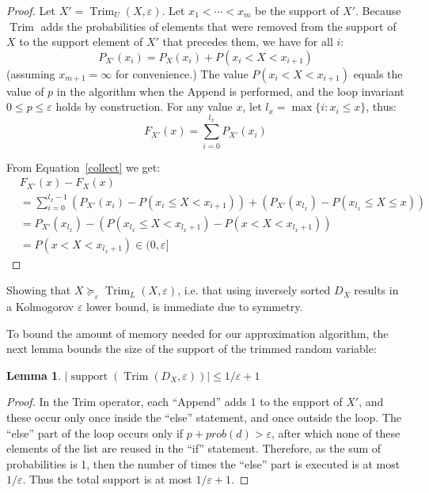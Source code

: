 \documentclass[review]{elsarticle}
\newtheorem{lemma}{Lemma}
\DeclareMathOperator{\Trim}{Trim}
\begin{document}
\begin{proof}
Let $X'=\Trim_U(X,\varepsilon)$. 
Let $x_1{<}\cdots{<}x_m$ be the support of $X'$. 
Because $\Trim$ adds the probabilities of elements that were removed from the support of $X$ 
to the support element of $X'$ that precedes them, 
we have for all $i$:
\begin{equation}
P_{X'}(x_i) = P_X(x_i) +  P(x_i < X < x_{i+1})
\label{collect}
\end{equation}
(assuming $x_{m+1} = \infty$ for convenience.)
The value $P(x_i < X < x_{i+1})$ equals the value of $p$ in
the algorithm when the Append is performed, and  the loop invariant $0 \leq p \leq \varepsilon$ holds by construction.
For any value $x$, let $l_x=\max\{ i \colon x_i\leq x\}$, thus:
\[
F_{X'}(x) = \sum_{i=0}^{l_x} P_{X'}(x_i)
\]

From Equation~\eqref{collect} we get:
{
\begin{align*}
&F_{X'}(x) - F_{X}(x)  \\
 &{=} \sum_{i=0}^{l_x-1} (P_{X'}(x_i)- P(x_i\leq X <x_{i+1})) +(P_{X'}(x_{l_x})-P(x_{l_x} \leq X \leq x)) \\%
&{=}P_{X'}(x_{l_x}) {-} (P(x_{l_x} {\leq} X {<} x_{l_x+1}) {-} P(x {<} X {<} x_{l_x+1})) \\
&{=}P(x < X < x_{l_x+1}) \in (0,\varepsilon]
\end{align*}}
\end{proof}
%
Showing that $X \succeq_\varepsilon \Trim_L(X,\varepsilon)$, i.e. that using inversely sorted $D_X$ results in a Kolmogorov $\varepsilon$ lower bound, is immediate due to symmetry.

To bound the amount of memory needed for our approximation algorithm,
the next lemma bounds the size of the support of the trimmed random variable:


\begin{lemma} \label{SizeD}
$|\operatorname{support}(\Trim(D_X,\varepsilon))| \leq 1/\varepsilon +1$
\end{lemma}

\begin{proof}
In the Trim operator, each ``Append'' adds 1 to the support of $X'$, and these occur only once inside
the ``else'' statement, and once outside the loop.
The ``else'' part of the loop occurs only if $p+prob(d)> \varepsilon$,
after which none of these elements of the list are reused in the ``if'' statement.
Therefore, as the sum of probabilities is 1, then the number of times
the ``else'' part is executed is at most ${1}/{\varepsilon}$. Thus the total support
is at most ${1}/{\varepsilon}+1$.
\end{proof}
\end{document}
